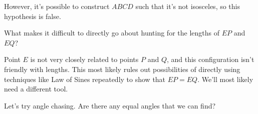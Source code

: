 However, it's possible to construct $ABCD$ such that it's not isosceles, so this hypothesis is false.

What makes it difficult to directly go about hunting for the lengths of $EP$ and $EQ$?











Point $E$ is not very closely related to points $P$ and $Q$, and this configuration isn't friendly with lengths. This most likely rules out possibilities of directly using techniques like Law of Sines repeatedly to show that $EP = EQ$. We'll most likely need a different tool.


Let's try angle chasing. Are there any equal angles that we can find?



